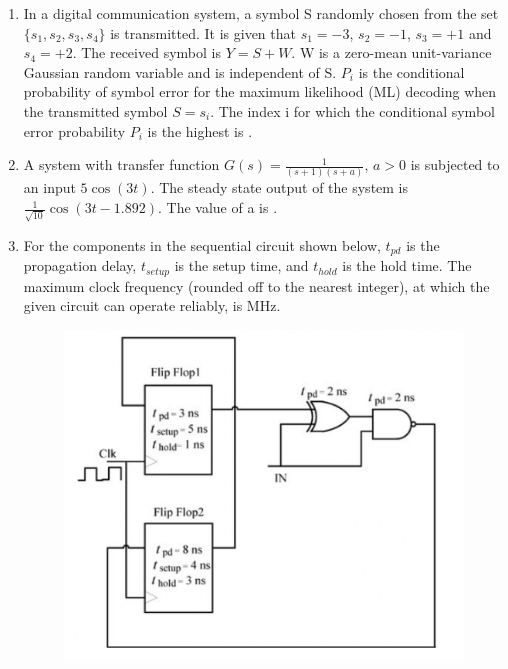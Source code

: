 \documentclass[a4paper, 11pt]{article}
\begin{document}
\begin{enumerate}
    \hfill{}

    \item In a digital communication system, a symbol S randomly chosen from the set $\{s_1, s_2, s_3, s_4\}$ is transmitted. It is given that $s_1 = -3$, $s_2 = -1$, $s_3 = +1$ and $s_4 = +2$. The received symbol is $Y = S+W$. W is a zero-mean unit-variance Gaussian random variable and is independent of S. $P_i$ is the conditional probability of symbol error for the maximum likelihood (ML) decoding when the transmitted symbol $S=s_i$. The index i for which the conditional symbol error probability $P_i$ is the highest is \underline{\hspace{2cm}}.

    \hfill{}

    \item A system with transfer function $G(s) = \frac{1}{(s+1)(s+a)}$, $a>0$ is subjected to an input $5\cos(3t)$. The steady state output of the system is $\frac{1}{\sqrt{10}}\cos(3t-1.892)$. The value of a is \underline{\hspace{2cm}}.

    \hfill{}

    \item For the components in the sequential circuit shown below, $t_{pd}$ is the propagation delay, $t_{setup}$ is the setup time, and $t_{hold}$ is the hold time. The maximum clock frequency (rounded off to the nearest integer), at which the given circuit can operate reliably, is \underline{\hspace{2cm}} MHz.
    \begin{figure}[H]
        \centering
        \includegraphics[width=0.8\columnwidth]{figs/Q50.png}
        \caption*{}
        \label{fig:q60}
    \end{figure}


\end{enumerate}
\end{document}
